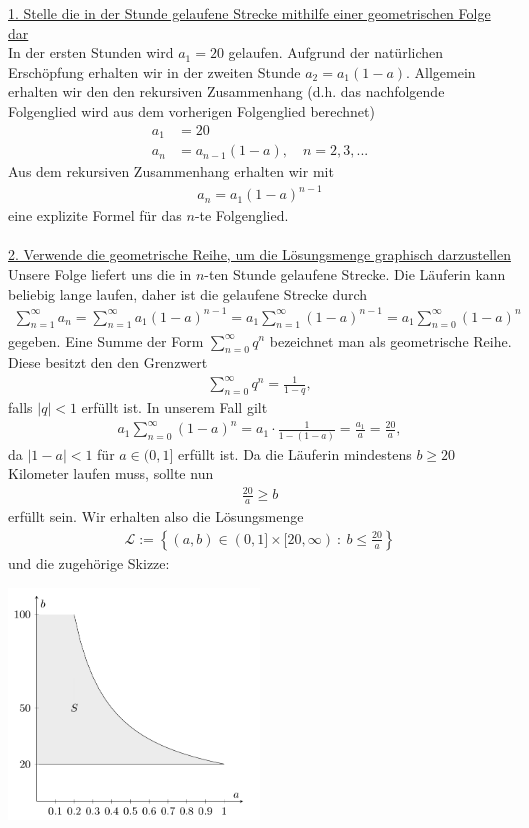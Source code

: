 \underline{1. Stelle die in der Stunde gelaufene Strecke mithilfe einer geometrischen Folge dar}\\
In der ersten Stunden wird $a_1 = 20$ gelaufen. Aufgrund der natürlichen Erschöpfung erhalten wir in der zweiten Stunde
$a_2 = a_1 (1 - a)$. Allgemein erhalten wir den den rekursiven Zusammenhang (d.h. das nachfolgende Folgenglied wird aus dem vorherigen Folgenglied berechnet)
\begin{align*}
a_1 &= 20\\
a_n &= a_{n-1} (1-a), \quad n = 2 , 3,...
\end{align*}
Aus dem rekursiven Zusammenhang erhalten wir mit
\begin{align*}
a_n = a_1 (1-a)^{n-1}
\end{align*}
eine explizite Formel für das $ n $-te Folgenglied.
\\
\\
\underline{2. Verwende die geometrische Reihe, um die Lösungsmenge graphisch darzustellen}\\
Unsere Folge liefert uns die in $ n $-ten Stunde gelaufene Strecke. Die Läuferin kann beliebig lange laufen, daher ist die gelaufene Strecke durch
\begin{align*}
\sum \limits_{n = 1}^\infty a_n 
=
\sum \limits_{n=1}^\infty a_1 (1-a)^{n-1}
= a_1 \sum \limits_{n=1}^\infty  (1-a)^{n-1}
= a_1 \sum \limits_{n=0}^\infty  (1-a)^{n}
\end{align*}
gegeben. Eine Summe der Form $ \sum_{n=0}^\infty q^n $
bezeichnet man als geometrische Reihe. Diese besitzt den den Grenzwert
\begin{align*}
\sum \limits_{n=0}^\infty q^n = \frac{1}{1-q},
\end{align*}
falls $ |q| < 1 $ erfüllt ist. In unserem Fall gilt
\begin{align*}
a_1 \sum \limits_{n=0}^\infty  (1-a)^{n} = a_1 \cdot \frac{1}{1-(1-a)} = \frac{a_1}{a} = \frac{20}{a},
\end{align*}
da $ | 1 -a | < 1 $ für $ a \in (0,1] $ erfüllt ist.
Da die Läuferin mindestens $ b \geq 20  $ Kilometer laufen muss, sollte nun 
\begin{align*}
\frac{20}{a} \geq b 
\end{align*} 
erfüllt sein. Wir erhalten also die Lösungsmenge
\begin{align*}
\mathcal{L}
:= \left\{ (a,b ) \in (0,1] \times [20,\infty) \ : \ b \leq \frac{20}{a}  \right\}
\end{align*}
und die zugehörige Skizze:
\begin{center}
	\includegraphics[width=0.5\textwidth]{pictures/auf1_d.png}
\end{center}

\newpage